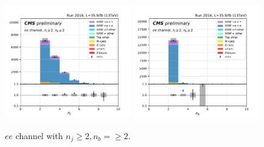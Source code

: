 \begin{figure}[ht]
    \includegraphics[width=0.49\textwidth]{chapters/Analysis/sectionPlots/figures/kinematics_pickles/ee/2b/ee_2b_nJets.pdf}
    \includegraphics[width=0.49\textwidth]{chapters/Analysis/sectionPlots/figures/kinematics_pickles/ee/2b/ee_2b_nBJets.pdf}
    
    \caption{$ee$ channel with $n_j\geq2, n_b=\geq2$.}
\end{figure}

